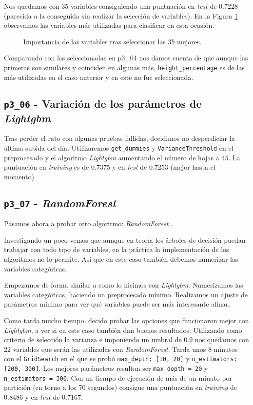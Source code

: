 \documentclass[a4paper, 20pt]{article}
\begin{document}
Nos quedamos con 35 variables consiguiendo una puntuación en \textit{test} de 0.7228 (parecida a la conseguida sin realizar la selección de variables). En la Figura \ref{fig:lgbm_imp_05_35} observamos las variables más utilizadas para clasificar en esta ocasión.

\begin{figure}[H]
    \centering
    \caption{Importancia de las variables tras seleccionar las 35 mejores.}
    \label{fig:lgbm_imp_05_35}
\end{figure}

Comparando con las seleccionadas en p3\_04 nos damos cuenta de que aunque las primeras son similares y coinciden en algunas más, \texttt{height\_percentage} es de las más utilizadas en el caso anterior y en este no fue seleccionada.

\subsection{\texttt{p3\_06} - Variación de los parámetros de \textit{Lightgbm}}
Tras perder el rato con algunas pruebas fallidas, decidimos no desperdiciar la última subida del día. Utilizaremos \texttt{get\_dummies} y \texttt{VarianceThreshold} en el preprocesado y el algoritmo \textit{Lightgbm} aumentando el número de hojas a 45. La puntuación en \textit{training} es de 0.7375 y en \textit{test} de 0.7253 (mejor hasta el momento).

\subsection{\texttt{p3\_07} - \textit{RandomForest}}

Pasamos ahora a probar otro algoritmo: \textit{RandomForest} \cite{noauthor_3.2.4.3.1._nodate}.

Investigando un poco vemos que aunque en teoría los árboles de decisión puedan trabajar con todo tipo de variables, en la práctica la implementación de los algoritmos no lo permite. Así que en este caso también debemos numerizar las variables categóricas.

Empezamos de forma similar a como lo hicimos con \textit{Lightgbm}. Numerizamos las variables categóricas, haciendo un preprocesado mínimo. Realizamos un ajuste de parámetros mínimo para ver qué variables puede ser más interesante afinar.

Como tarda mucho tiempo, decido probar las opciones que funcionaron mejor con \textit{Lightgbm}, a ver si en este caso también dan buenos resultados. Utilizando como criterio de selección la varianza e imponiendo un umbral de 0.9 nos quedamos con 22 variables que serán las utilizadas con \textit{RandomForest}. Tarda unos 8 minutos con el \texttt{GridSearch} en el que se probó \texttt{max\_depth: [10, 20]} y \texttt{n\_estimators:[200, 300]}. Los mejores parámetros resultan ser \texttt{max\_depth = 20} y \texttt{n\_estimators = 300}.
Con un tiempo de ejecución de más de un minuto por partición (en torno a los 70 segundos) consigue una puntuación en \textit{training} de 0.8486 y en \textit{test} de 0.7167.
\end{document}
